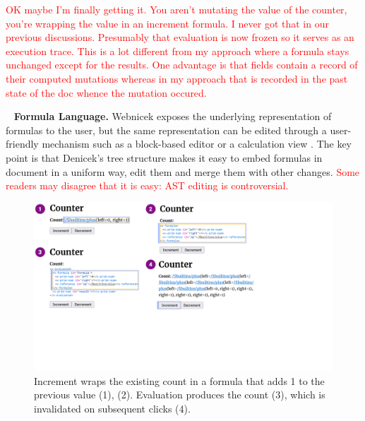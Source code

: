 \documentclass[sigconf,anonymous,screen]{acmart}
\newcommand{\note}[1]{\textcolor{red}{#1}}
\DeclareRobustCommand{\keyideabox}[3]{\begin{tcolorbox}[breakable,
  boxsep=5pt,left=0pt,right=0pt,top=0pt,bottom=0pt,width=\dimexpr\columnwidth\relax,
  colback=gray!20,colframe=gray!20,
  enlarge bottom by=0pt,enlarge top by=0pt,
  arc=0pt,outer arc=0pt]
\lettrine[lraise=0.3]{\LARGE #1}{~}
\small \textbf{#2.} #3
\end{tcolorbox}
}
\begin{document}
\note{OK maybe I'm finally getting it. You aren't mutating the value of the counter, you're wrapping the value in an increment formula. I never got that in our previous discussions. Presumably that evaluation is now frozen so it serves as an execution trace. This is a lot different from my approach where a formula stays unchanged except for the results. One advantage is that fields contain a record of their computed mutations whereas in my approach that is recorded in the past state of the doc whence the mutation occured.}

\keyideabox{\faSuperscript}{Formula Language}{
Webnicek exposes the underlying representation of formulas to the user, but the same representation
can be edited through a user-friendly mechanism such as a block-based editor
\cite{jansen-2019-xlblocks} or a calculation view \cite{sarkar-2018-calc}. The key point
is that Denicek's tree structure makes it easy to embed formulas in document in a uniform
way, edit them and merge them with other changes. \note{Some readers may disagree that it is easy: AST editing is controversial. }}


\begin{figure}[t]
\vspace{-0.5em}
\includegraphics[width=0.95\columnwidth,clip,trim=0cm 7cm 8cm 0cm]{fig/counter.pdf}
\vspace{-0.5em}
\caption{Increment wraps the existing count in a formula that adds 1 to the
previous value (1), (2). Evaluation produces the count (3), which is invalidated on subsequent clicks (4).}
\label{fig:counter}
\vspace{-1em}
\end{figure}

\end{document}
